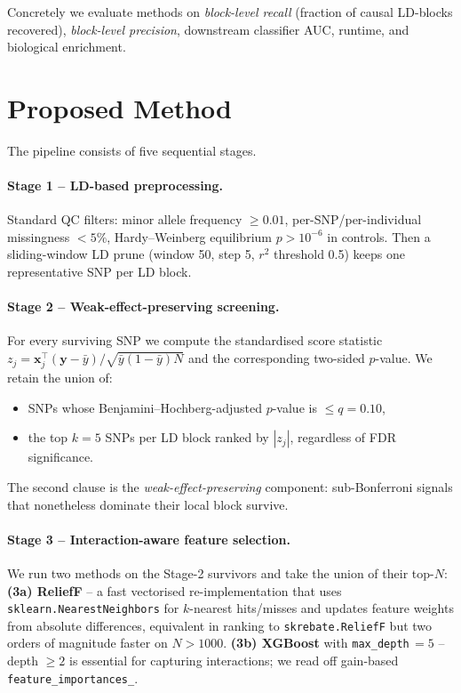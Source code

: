 \documentclass[11pt,a4paper]{article}
\begin{document}
Concretely we evaluate methods on \emph{block-level recall} (fraction of
causal LD-blocks recovered), \emph{block-level precision}, downstream
classifier AUC, runtime, and biological enrichment.

\section{Proposed Method}

The pipeline consists of five sequential stages.

\paragraph{Stage 1 -- LD-based preprocessing.} Standard QC filters: minor
allele frequency $\geq 0.01$, per-SNP/per-individual missingness $< 5\%$,
Hardy--Weinberg equilibrium $p > 10^{-6}$ in controls. Then a sliding-window
LD prune (window 50, step 5, $r^2$ threshold 0.5) keeps one representative
SNP per LD block.

\paragraph{Stage 2 -- Weak-effect-preserving screening.} For every
surviving SNP we compute the standardised score statistic
$z_j = \mathbf{x}_j^\top (\mathbf{y} - \bar y) / \sqrt{\bar y (1-\bar y) N}$
and the corresponding two-sided $p$-value. We retain the union of:
\begin{itemize}[leftmargin=*,nosep]
\item SNPs whose Benjamini--Hochberg-adjusted $p$-value is $\leq q = 0.10$,
\item the top $k = 5$ SNPs per LD block ranked by $|z_j|$, regardless of
      FDR significance.
\end{itemize}
The second clause is the \emph{weak-effect-preserving} component:
sub-Bonferroni signals that nonetheless dominate their local block survive.

\paragraph{Stage 3 -- Interaction-aware feature selection.} We run two
methods on the Stage-2 survivors and take the union of their top-$N$:
\textbf{(3a) ReliefF} -- a fast vectorised re-implementation that uses
\texttt{sklearn.NearestNeighbors} for $k$-nearest hits/misses and updates
feature weights from absolute differences, equivalent in ranking to
\texttt{skrebate.ReliefF} but two orders of magnitude faster on
$N>1000$. \textbf{(3b) XGBoost} with \texttt{max\_depth}$\,=5$ -- depth
$\geq 2$ is essential for capturing interactions; we read off
gain-based \texttt{feature\_importances\_}.
\end{document}
